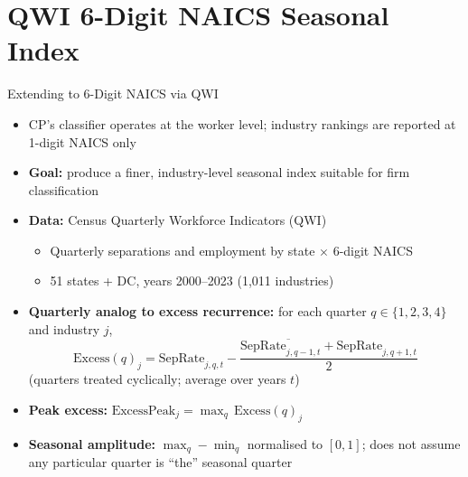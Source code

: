 \documentclass[aspectratio=169]{beamer}
\begin{document}
\section{QWI 6-Digit NAICS Seasonal Index}

\begin{frame}{Extending to 6-Digit NAICS via QWI}
  \begin{itemize}
    \item CP's classifier operates at the worker level; industry rankings are
          reported at 1-digit NAICS only
    \item \textbf{Goal:} produce a finer, industry-level seasonal index suitable
          for firm classification
    \bigskip
    \item \textbf{Data:} Census Quarterly Workforce Indicators (QWI)
    \begin{itemize}
      \item Quarterly separations and employment by state $\times$ 6-digit NAICS
      \item 51 states + DC, years 2000--2023 (1,011 industries)
    \end{itemize}
    \bigskip
    \item \textbf{Quarterly analog to excess recurrence:} for each quarter
          $q \in \{1,2,3,4\}$ and industry $j$,
    \[
      \text{Excess}(q)_{j}
      = \overline{
          \text{SepRate}_{j,q,t}
          - \frac{\text{SepRate}_{j,q-1,t} + \text{SepRate}_{j,q+1,t}}{2}
        }
    \]
    (quarters treated cyclically; average over years $t$)
    \item \textbf{Peak excess:} $\text{ExcessPeak}_{j} = \max_q\, \text{Excess}(q)_j$
    \item \textbf{Seasonal amplitude:} $\max_q - \min_q$ normalised to $[0,1]$;
          does not assume any particular quarter is ``the'' seasonal quarter
  \end{itemize}
\end{frame}
\end{document}

